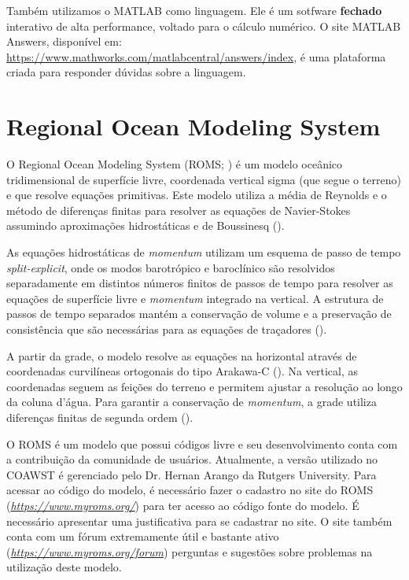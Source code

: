 \noindent Também utilizamos o MATLAB como linguagem. Ele é um sotfware \textbf{fechado} interativo de alta performance, voltado para o 
          cálculo numérico. O site MATLAB Answers, disponível em: \textcolor{bleu_cite}{\href{https://www.mathworks.com/matlabcentral/answers/index}{https://www.mathworks.com/matlabcentral/answers/index}}, 
          é uma plataforma criada para responder dúvidas sobre a linguagem.





\section{Regional Ocean Modeling System}\label{romssecao}
\bigskip
\noindent O Regional Ocean Modeling System (ROMS; \cite{Shchepetkin2005}) é um modelo oceânico tridimensional de superfície livre, 
          coordenada vertical sigma (que segue o terreno) e que resolve equações primitivas. Este modelo utiliza a média de Reynolds 
          e o método de diferenças finitas para resolver as equações de Navier-Stokes assumindo aproximações hidrostáticas 
          e de Boussinesq (\cite{Haidvogel2008}).
\bigskip

\noindent As equações hidrostáticas de \textit{momentum} utilizam um esquema de passo de tempo \textit{split-explicit}, 
          onde os modos barotrópico e baroclínico são resolvidos separadamente em distintos números finitos de passos
          de tempo para resolver as equações de superfície livre e \textit{momentum} integrado na vertical. A estrutura de passos
          de tempo separados mantém a conservação de volume e a preservação de consistência que são necessárias para as equações 
          de traçadores (\cite{Shchepetkin2005,Haidvogel2008}).
\bigskip

\noindent A partir da grade, o modelo resolve as equações na horizontal através de coordenadas curvilíneas ortogonais do 
          tipo Arakawa-C (\cite{Arakawa1977}). Na vertical, as coordenadas seguem as feições do terreno e permitem ajustar a 
          resolução ao longo da coluna d'água. Para garantir a conservação de \textit{momentum}, a grade utiliza diferenças finitas de
          segunda ordem (\cite{Haidvogel2008}).
\bigskip

\noindent O ROMS é um modelo que possui códigos livre e seu desenvolvimento conta com a contribuição da comunidade de usuários.
          Atualmente, a versão utilizado no COAWST é gerenciado pelo Dr. Hernan Arango da Rutgers University. Para acessar ao 
          código do modelo, é necessário fazer o cadastro no site do ROMS 
          (\textcolor{bleu_cite}{\href{https://www.myroms.org/}{\textit{https://www.myroms.org/}}}) para ter acesso ao código 
          fonte do modelo. É necessário apresentar uma justificativa para se cadastrar no site. O site também conta com um fórum 
          extremamente útil e bastante ativo (\textcolor{bleu_cite}{\href{https://www.myroms.org/forum}{\textit{https://www.myroms.org/forum}}}) 
          perguntas e sugestões sobre problemas na utilização deste modelo.
\bigskip

